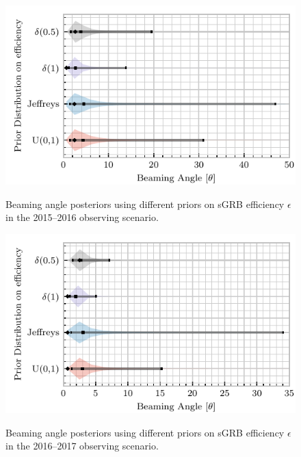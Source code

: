 \documentclass[twocolumn,nofootinbib]{revtex4-1}
\newcommand{\dwnote}[1]{{\color{dwnote}{[\textbf{DW}: #1]}}}
\begin{document}
\begin{figure}
\centering
{\includegraphics[width=\linewidth]{O1_beaming_posteriors_violin.pdf}}
\caption{Beaming angle posteriors using different priors on \ac{sGRB} efficiency $\epsilon$ in the 2015--2016 observing scenario.
    \label{fig:jetposterior2016}}
\end{figure}

\begin{figure}
\centering
{\includegraphics[width=\linewidth]{O2_beaming_posteriors_violin.pdf}}
\caption{Beaming angle posteriors using different priors on \ac{sGRB} efficiency $\epsilon$ in the 2016--2017 observing scenario.
    \label{fig:jetposterior2022}}
\end{figure}
\end{document}
